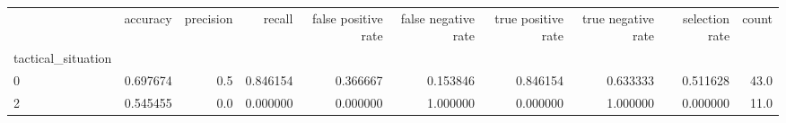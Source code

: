 \begin{tabular}{lrrrrrrrrr}
\toprule
{} &  accuracy &  precision &    recall &  false positive rate &  false negative rate &  true positive rate &  true negative rate &  selection rate &  count \\
tactical\_situation &           &            &           &                      &                      &                     &                     &                 &        \\
\midrule
0                  &  0.697674 &        0.5 &  0.846154 &             0.366667 &             0.153846 &            0.846154 &            0.633333 &        0.511628 &   43.0 \\
2                  &  0.545455 &        0.0 &  0.000000 &             0.000000 &             1.000000 &            0.000000 &            1.000000 &        0.000000 &   11.0 \\
\bottomrule
\end{tabular}
